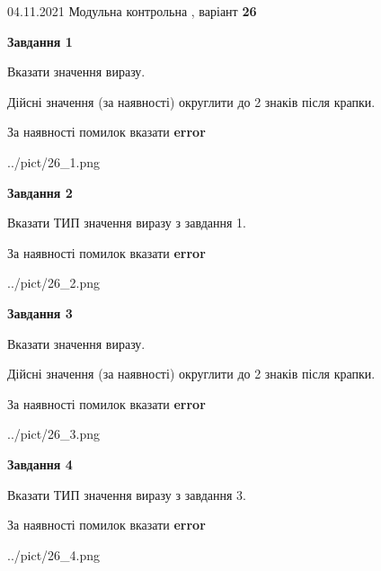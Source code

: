 \documentclass[11pt, ukrainian]{article}
\begin{document}
{04.11.2021 Модульна контрольна , варіант  \No \textbf { 26 }\par}
{
\begin {large}
{\begin {center}\textbf{Завдання 1}\end {center}}\par
Вказати значення виразу. \par
Дійсні значення (за наявності) округлити до 2 знаків після крапки. \par
За наявності помилок вказати \textbf{error}

\begin{center}
	{../pict/26_1.png}
\end{center}
\newpage

{\begin {center}\textbf{Завдання 2}\end {center}}\par
Вказати ТИП значення виразу з завдання 1. \par
За наявності помилок вказати \textbf{error}

\begin{center}
	{../pict/26_2.png}
\end{center}
\newpage

{\begin {center}\textbf{Завдання 3}\end {center}}\par
Вказати значення виразу. \par
Дійсні значення (за наявності) округлити до 2 знаків після крапки. \par
За наявності помилок вказати \textbf{error}

\begin{center}
	{../pict/26_3.png}
\end{center}
\newpage

{\begin {center}\textbf{Завдання 4}\end {center}}\par
Вказати ТИП значення виразу з завдання 3. \par
За наявності помилок вказати \textbf{error}

\begin{center}
	{../pict/26_4.png}
\end{center}
\newpage


\end{large}}
\end{document}
